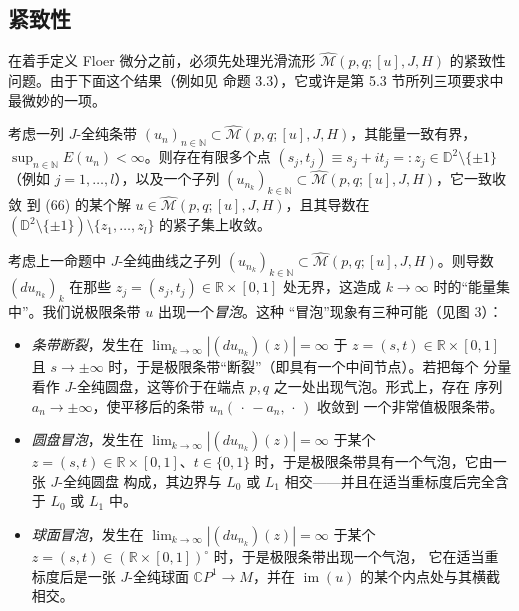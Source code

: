 \medskip
\noindent{}
\medskip

\subsection{紧致性}\label{sec:5.6}

在着手定义 Floer 微分之前，必须先处理光滑流形
$\widehat{\mathcal M}(p,q;[u],J,H)$ 的紧致性问题。由于下面这个结果（例如见
\cite{Sal97} 命题 3.3），它或许是第 5.3 节所列三项要求中最微妙的一项。

\begin{Pro}\label{prop:5.34}
考虑一列 $J$-全纯条带
$(u_n)_{n\in\mathbb N}\subset\widehat{\mathcal M}(p,q;[u],J,H)$，其能量一致有界，
$\sup_{n\in\mathbb N}E(u_n)<\infty$。则存在有限多个点
$(s_j,t_j)\equiv s_j+it_j=:z_j\in\mathbb D^2\setminus\{\pm1\}$（例如
$j=1,\dots,l$），以及一个子列
$(u_{n_k})_{k\in\mathbb N}\subset\widehat{\mathcal M}(p,q;[u],J,H)$，它一致收敛
到 (66) 的某个解 $u\in\widehat{\mathcal M}(p,q;[u],J,H)$，且其导数在
$(\mathbb D^2\setminus\{\pm1\})\setminus\{z_1,\dots,z_l\}$ 的紧子集上收敛。
\end{Pro}


\begin{Def}\label{def:5.35}
考虑上一命题中 $J$-全纯曲线之子列
$(u_{n_k})_{k\in\mathbb N}\subset\widehat{\mathcal M}(p,q;[u],J,H)$。则导数
$(du_{n_k})_k$ 在那些 $z_j=(s_j,t_j)\in\mathbb R\times[0,1]$ 处无界，这造成
$k\to\infty$ 时的“能量集中”。我们说极限条带 $u$ 出现一个\emph{冒泡}。这种
“冒泡”现象有三种可能（见图 3）：
\begin{itemize}
  \item \emph{条带断裂}，发生在
  $\lim_{k\to\infty}|(du_{n_k})(z)|=\infty$ 于 $z=(s,t)\in\mathbb R\times[0,1]$
  且 $s\to\pm\infty$ 时，于是极限条带“断裂”（即具有一个中间节点）。若把每个
  分量看作 $J$-全纯圆盘，这等价于在端点 $p,q$ 之一处出现气泡。形式上，存在
  序列 $a_n\to\pm\infty$，使平移后的条带 $u_n(\,\cdot\,-a_n,\,\cdot\,)$ 收敛到
  一个非常值极限条带。
  \item \emph{圆盘冒泡}，发生在
  $\lim_{k\to\infty}|(du_{n_k})(z)|=\infty$ 于某个 $z=(s,t)\in\mathbb R\times
  [0,1]$、$t\in\{0,1\}$ 时，于是极限条带具有一个气泡，它由一张 $J$-全纯圆盘
  构成，其边界与 $L_0$ 或 $L_1$ 相交——并且在适当重标度后完全含于 $L_0$ 或
  $L_1$ 中。
  \item \emph{球面冒泡}，发生在
  $\lim_{k\to\infty}|(du_{n_k})(z)|=\infty$ 于某个
  $z=(s,t)\in(\mathbb R\times[0,1])^\circ$ 时，于是极限条带出现一个气泡，
  它在适当重标度后是一张 $J$-全纯球面 $\mathbb C P^1\to M$，并在
  $\operatorname{im}(u)$ 的某个内点处与其横截相交。
\end{itemize}
\end{Def}

